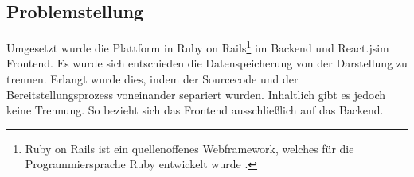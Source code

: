 \subsection{Problemstellung}

Umgesetzt wurde die Plattform in Ruby on Rails\footnote{
Ruby on Rails ist ein quellenoffenes Webframework, welches für die Programmiersprache Ruby entwickelt wurde \parencites{ruby_org}[vgl.][S. 24]{sieben_wochen}.
} im Backend und React.js\footnotemark im Frontend. Es wurde sich entschieden die Datenspeicherung von der Darstellung zu trennen. Erlangt wurde dies, indem der Sourcecode und der Bereitstellungsprozess voneinander separiert wurden. Inhaltlich gibt es jedoch keine Trennung. So bezieht sich das Frontend ausschließlich auf das Backend.



